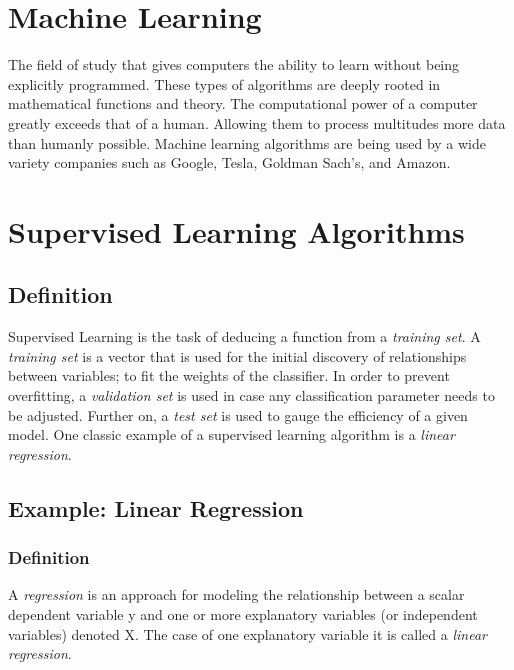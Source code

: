 \documentclass[a4paper]{article}
\begin{document}
\section{Machine Learning}
The field of study that gives computers the ability to learn without being explicitly programmed. These types of algorithms are deeply rooted in mathematical functions and theory. The computational power of a computer greatly exceeds that of a human. Allowing them to process multitudes more data than humanly possible. Machine learning algorithms are being used by a wide variety companies such as Google, Tesla, Goldman Sach's, and Amazon.

\section{Supervised Learning Algorithms}
\subsection{Definition}
Supervised Learning is the task of deducing a function from a \textit{training set}. \cite{Ng} A \textit{training set} is a vector that is used for the initial discovery of relationships between variables; to fit the weights of the classifier. In order to prevent overfitting, a \textit{validation set} is used in case any classification parameter needs to be adjusted. Further on, a \textit{test set} is used to gauge the efficiency of a given model. One classic example of a supervised learning algorithm is a \textit{linear regression}.
\subsection{Example: Linear Regression}
\subsubsection{Definition}
A \textit{regression} is an approach for modeling the relationship between a scalar dependent variable y and one or more explanatory variables (or independent variables) denoted X. The case of one explanatory variable it is called a \textit{linear regression}.
\end{document}
